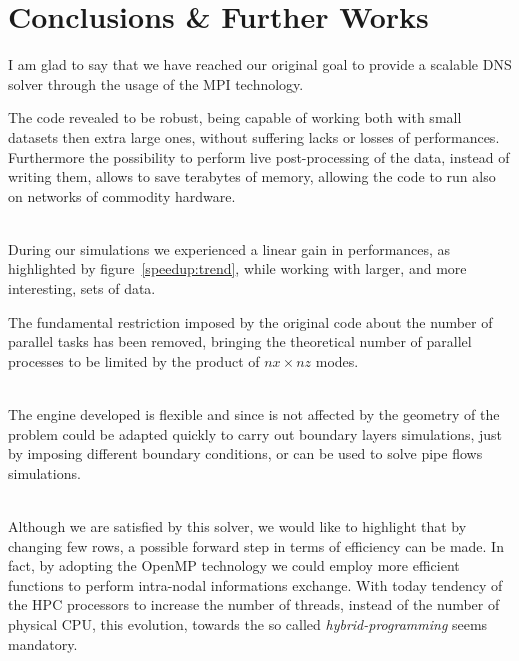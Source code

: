 \chapter{Conclusions \& Further Works}
I am glad to say that we have reached our original goal to provide a scalable DNS solver through the usage of the MPI technology. \par
The code revealed to be robust, being capable of working both with small datasets then extra large ones, without suffering lacks or losses of performances.
Furthermore the possibility to perform live post-processing of the data, instead of writing them, allows to save terabytes of memory, allowing the code to run also on networks of commodity hardware. \\~\par
During our simulations we experienced a linear gain in performances, as highlighted by figure~\ref{speedup:trend}, while working with larger, and more interesting, sets of data. \par
The fundamental restriction imposed by the original code about the number of parallel tasks has been removed, bringing the theoretical number of parallel processes to be limited by the product of $nx \times nz$ modes. \\~\par
The engine developed is flexible and since is not affected by the geometry of the problem could be adapted quickly to carry out boundary layers simulations, just by imposing different boundary conditions, or can be used to solve pipe flows simulations.\\~\par
Although we are satisfied by this solver, we would like to highlight that by changing few rows, a possible forward step in terms of efficiency can be made.
In fact, by adopting the OpenMP technology we could employ more efficient functions to perform intra-nodal informations exchange. With today tendency of the HPC processors to increase the number of threads, instead of the number of physical CPU, this evolution, towards the so called \emph{hybrid-programming} seems mandatory.
